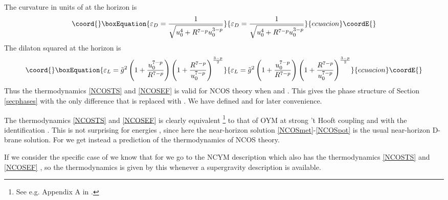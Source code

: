 \documentclass[a4paper,twoside,titlepage,12pt]{article}
\begin{document}
The curvature in units of \coordHE{} at the horizon is
%
\begin{equation}\coord{}\boxEquation{
\label{epsD}
\varepsilon_D = \frac{1}{\sqrt{u_0^4 + R^{7-p} u_0^{3-p} }}
}{
\varepsilon_D = \frac{1}{\sqrt{u_0^4 + R^{7-p} u_0^{3-p} }}
}{ecuacion}\coordE{}\end{equation}
%
The dilaton squared at the horizon is
%
\begin{equation}\coord{}\boxEquation{
\label{epsL}
\varepsilon_L = \tilde{g}^2 \left( 1 + \frac{u_0^{7-p}}{R^{7-p}} \right)
\left( 1 + \frac{R^{7-p}}{u_0^{7-p}} \right)^{\frac{3-p}{2}}
}{
\varepsilon_L = \tilde{g}^2 \left( 1 + \frac{u_0^{7-p}}{R^{7-p}} \right)
\left( 1 + \frac{R^{7-p}}{u_0^{7-p}} \right)^{\frac{3-p}{2}}
}{ecuacion}\coordE{}\end{equation}
%
Thus the thermodynamics \eqref{NCOSTS} and \eqref{NCOSEF} is
valid for NCOS theory when \coordHE{} and \coordHE{}.
This gives the phase structure of Section \ref{secphases} 
with the only difference
that \coordHE{} is replaced with \coordHE{}. 
We have defined \coordHE{} and \coordHE{} for later convenience.


The thermodynamics \eqref{NCOSTS} and \eqref{NCOSEF} is clearly equivalent%
\footnote{See e.g. Appendix A in \cite{Harmark:1999xt}.}
to that of OYM at strong 't Hooft coupling and
with the identification \coordHE{}.
This is not surprising for energies \coordHE{}, since here
the near-horizon solution \eqref{NCOSmet}-\eqref{NCOSpot} 
is the usual near-horizon D\coordHE{}-brane solution.
For \coordHE{} we get instead a prediction of the thermodynamics of
NCOS theory. 

If we consider the specific case of \coordHE{} we know that
for \coordHE{} we go to the NCYM description
which also has the thermodynamics \eqref{NCOSTS} and \eqref{NCOSEF}
\cite{Maldacena:1999mh}, so the thermodynamics is given by this whenever
a supergravity description is available.
\end{document}
